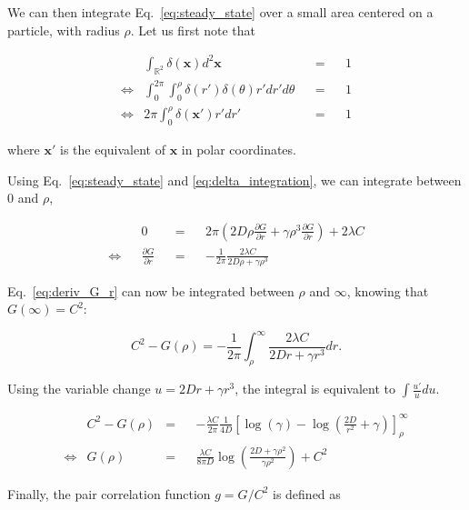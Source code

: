 We can then integrate Eq.~\ref{eq:steady_state} over a small
area centered on a particle, with radius $\rho$. Let us first note
that

\begin{align}
& \int_{\mathbb{R}^{2}}\delta(\boldsymbol{x})d^{2}\boldsymbol{x} & & = & & 1\nonumber \\
\Leftrightarrow & \int_{0}^{2\pi}\int_{0}^{\rho}\delta(r')\delta(\theta)r'dr'd\theta & & = & & 1\nonumber \\
\Leftrightarrow & 2\pi\int_{0}^{\rho}\delta(\boldsymbol{x'})r'dr' & & = & & 1\label{eq:delta_integration}
\end{align}

where $\boldsymbol{x'}$ is the equivalent of $\boldsymbol{x}$ in polar coordinates. 

Using Eq.~\ref{eq:steady_state} and \ref{eq:delta_integration},
we can integrate between 0 and $\rho$, 

\begin{align}
 & & 0 & & = & & 2\pi\left(2D\rho\frac{\partial G}{\partial r}+\gamma\rho^{3}\frac{\partial G}{\partial r}\right)+2\lambda C\nonumber \\
\Leftrightarrow & & \frac{\partial G}{\partial r} & & = & & -\frac{1}{2\pi}\frac{2\lambda C}{2D\rho+\gamma\rho^{3}}\label{eq:deriv_G_r}
\end{align}

Eq.~\ref{eq:deriv_G_r} can now be integrated between $\rho$ and $\infty$, knowing that $G(\infty)=C^{2}$:

\begin{equation}
 C^{2}-G(\rho) = -\frac{1}{2\pi}{\displaystyle \int_{\rho}^{\infty}}\frac{2\lambda C}{2Dr+\gamma r^{3}}dr.\label{eq:deriv_G_r_int1}
\end{equation}

Using the variable change $u=2Dr+\gamma r^{3}$, the integral is equivalent
to $\int\frac{u'}{u}du$.

{\color{blue}
\begin{align}
 & C^{2}-G(\rho) & = & & -\frac{\lambda C}{2\pi}\frac{1}{4D}\left[\log(\gamma)-\log\left(\frac{2D}{r^{2}}+\gamma\right)\right]_{\rho}^{\infty}\label{eq:deriv_G_rint2}\\
\Leftrightarrow & G(\rho) & = & & \frac{\lambda C}{8\pi D}\log\left(\frac{2D+\gamma \rho^{2}}{\gamma \rho^{2}}\right)+C^{2}\label{eq:G_rho}
\end{align}
}

Finally, the pair correlation function $g=G/C^{2}$ is defined as

